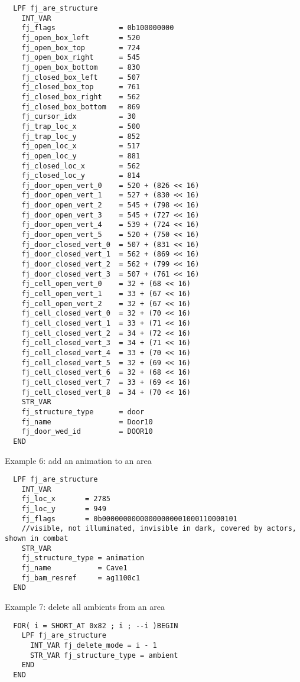 \documentclass{article}
\begin{document}
\begin{verbatim}
  LPF fj_are_structure
    INT_VAR
    fj_flags               = 0b100000000
    fj_open_box_left       = 520
    fj_open_box_top        = 724
    fj_open_box_right      = 545
    fj_open_box_bottom     = 830
    fj_closed_box_left     = 507
    fj_closed_box_top      = 761
    fj_closed_box_right    = 562
    fj_closed_box_bottom   = 869
    fj_cursor_idx          = 30
    fj_trap_loc_x          = 500
    fj_trap_loc_y          = 852
    fj_open_loc_x          = 517
    fj_open_loc_y          = 881
    fj_closed_loc_x        = 562
    fj_closed_loc_y        = 814
    fj_door_open_vert_0    = 520 + (826 << 16)
    fj_door_open_vert_1    = 527 + (830 << 16)
    fj_door_open_vert_2    = 545 + (798 << 16)
    fj_door_open_vert_3    = 545 + (727 << 16)
    fj_door_open_vert_4    = 539 + (724 << 16)
    fj_door_open_vert_5    = 520 + (750 << 16)
    fj_door_closed_vert_0  = 507 + (831 << 16)
    fj_door_closed_vert_1  = 562 + (869 << 16)
    fj_door_closed_vert_2  = 562 + (799 << 16)
    fj_door_closed_vert_3  = 507 + (761 << 16)
    fj_cell_open_vert_0    = 32 + (68 << 16)
    fj_cell_open_vert_1    = 33 + (67 << 16)
    fj_cell_open_vert_2    = 32 + (67 << 16)
    fj_cell_closed_vert_0  = 32 + (70 << 16)
    fj_cell_closed_vert_1  = 33 + (71 << 16)
    fj_cell_closed_vert_2  = 34 + (72 << 16)
    fj_cell_closed_vert_3  = 34 + (71 << 16)
    fj_cell_closed_vert_4  = 33 + (70 << 16)
    fj_cell_closed_vert_5  = 32 + (69 << 16)
    fj_cell_closed_vert_6  = 32 + (68 << 16)
    fj_cell_closed_vert_7  = 33 + (69 << 16)
    fj_cell_closed_vert_8  = 34 + (70 << 16)
    STR_VAR
    fj_structure_type      = door
    fj_name                = Door10
    fj_door_wed_id         = DOOR10
  END
\end{verbatim}
Example 6: add an animation to an area
\begin{verbatim}
  LPF fj_are_structure
    INT_VAR
    fj_loc_x       = 2785
    fj_loc_y       = 949
    fj_flags       = 0b00000000000000000001000110000101
    //visible, not illuminated, invisible in dark, covered by actors, shown in combat
    STR_VAR
    fj_structure_type = animation
    fj_name           = Cave1
    fj_bam_resref     = ag1100c1
  END
\end{verbatim}
Example 7: delete all ambients from an area
\begin{verbatim}
  FOR( i = SHORT_AT 0x82 ; i ; --i )BEGIN
    LPF fj_are_structure
      INT_VAR fj_delete_mode = i - 1
      STR_VAR fj_structure_type = ambient
    END
  END
\end{verbatim}
\end{document}
